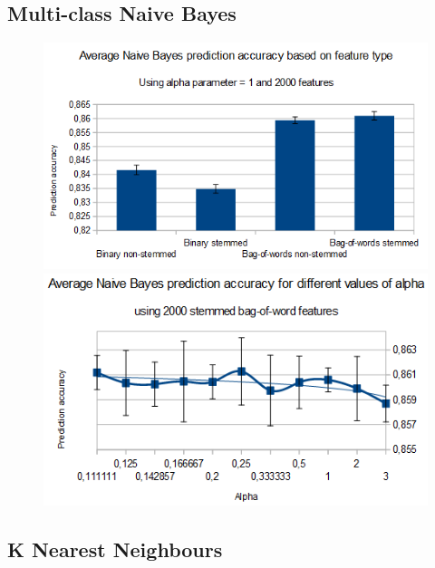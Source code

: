 \documentclass{acm_proc_article-sp}
\begin{document}
\subsection{Multi-class Naive Bayes}
\begin{figure} 
\includegraphics[width=1\columnwidth]{nb_feature_types.png}  
\includegraphics[width=1\columnwidth]{nb_alpha.png}  
\end{figure}

\subsection{K Nearest Neighbours}
\end{document}
